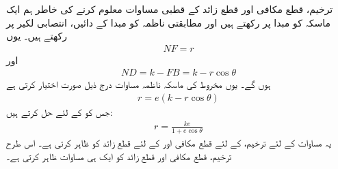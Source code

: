 ترخیم، قطع مکافی اور قطع زائد کے قطبی مساوات معلوم کرنے کی خاطر ہم ایک ماسکہ کو مبدا پر رکھتے ہیں اور مطابقتی ناظمہ کو مبدا کے دائیں، انتصابی لکیر  پر رکھتے ہیں۔ یوں 
\begin{align*}
NF=r
\end{align*}
اور
\begin{align*}
ND=k-FB=k-r\cos\theta
\end{align*}
ہوں گے۔ یوں مخروط کی ماسکہ ناظمہ مساوات  درج ذیل  صورت اختیار کرتی ہے
\begin{align*}
r=e(k-r\cos\theta)
\end{align*}
جس کو  کے لئے حل کرتے ہیں:
\begin{align}\label{مساوات_مخروط_ترخیم_قطع_مکافی_قطع_زائد}
r=\frac{ke}{1+e\cos\theta}
\end{align}
یہ مساوات  کے لئے ترخیم،  کے لئے قطع مکافی اور  کے لئے قطع زائد کو ظاہر کرتی ہے۔ اس طرح ترخیم، قطع مکافی اور قطع زائد کو ایک ہی مساوات ظاہر کرتی ہے۔

